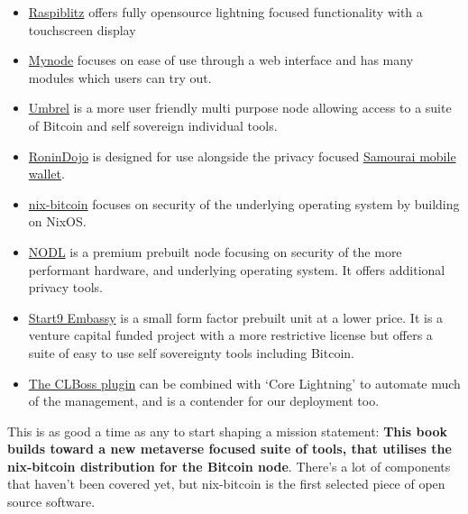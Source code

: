 \begin{itemize}
\item \href{https://github.com/rootzoll/raspiblitz}{Raspiblitz} offers fully opensource lightning focused functionality with a touchscreen display
\item \href{https://github.com/mynodebtc/mynode}{Mynode} focuses on ease of use through a web interface and has many modules which users can try out.
\item \href{https://github.com/getumbrel/umbrel-os}{Umbrel} is a more user friendly multi purpose node allowing access to a suite of Bitcoin and self sovereign individual tools.
\item \href{https://wiki.ronindojo.io/}{RoninDojo} is designed for use alongside the privacy focused \href{https://samouraiwallet.com/}{Samourai mobile wallet}.
\item \href{https://github.com/fort-nix/nix-bitcoin}{nix-bitcoin} focuses on security of the underlying operating system by building on NixOS.
\item \href{https://nodl.it}{NODL} is a premium prebuilt node focusing on security of the more performant hardware, and underlying operating system. It offers additional privacy tools.
\item \href{https://store.start9labs.com/collections/embassy}{Start9 Embassy} is a small form factor prebuilt unit at a lower price. It is a venture capital funded project with a more restrictive license but offers a suite of easy to use self sovereignty tools including Bitcoin. 
\item \href{https://www.osinteditor.com/NXN/mp_march28_f3/index.html}{The CLBoss plugin} can be combined with `Core Lightning' to automate much of the management, and is a contender for our deployment too.
\end{itemize}
This is as good a time as any to start shaping a mission statement: \textbf{This book builds toward a new metaverse focused suite of tools, that utilises the nix-bitcoin distribution for the Bitcoin node}. There's a lot of components that haven't been covered yet, but nix-bitcoin is the first selected piece of open source software.

